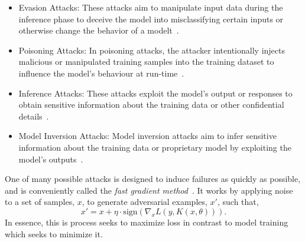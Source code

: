 \documentclass[conference]{IEEEtran}
\begin{document}
\begin{itemize}
    \item Evasion Attacks: These attacks aim to manipulate input data during the inference phase to deceive the model into misclassifying certain inputs or otherwise change the behavior of a modelt~\cite{biggio_evasion_2013, carlini_towards_2017, adversarialpatch, pixelattack, hopskipjump}.
    \item Poisoning Attacks: In poisoning attacks, the attacker intentionally injects malicious or manipulated training samples into the training dataset to influence the model's behaviour at run-time~\cite{biggio_poisoning_2013, saha2020hidden}. 
    \item Inference Attacks: These attacks exploit the model's output or responses to obtain sensitive information about the training data or other confidential details~\cite{chakraborty_adversarial_2018, orekondy2019knockoff}.
    \item Model Inversion Attacks: Model inversion attacks aim to infer sensitive information about the training data or proprietary model by exploiting the model's outputs~\cite{chakraborty_adversarial_2018, choquette2021label, li2021membership}. 
\end{itemize}
One of many possible attacks is designed to induce failures as quickly as possible, and is  conveniently called the \textit{fast gradient method}~\cite{fgm}. It works by applying noise to a set of samples, $x$, to generate adversarial examples, $x'$, such that,
\begin{equation}
x' = x + \eta \cdot \mathrm{sign}(\nabla_x L(y, K(x, \theta))).
\label{eq:fgm}
\end{equation}
In essence, this is process seeks to maximize loss in contrast to model training which seeks to minimize it.
\end{document}
